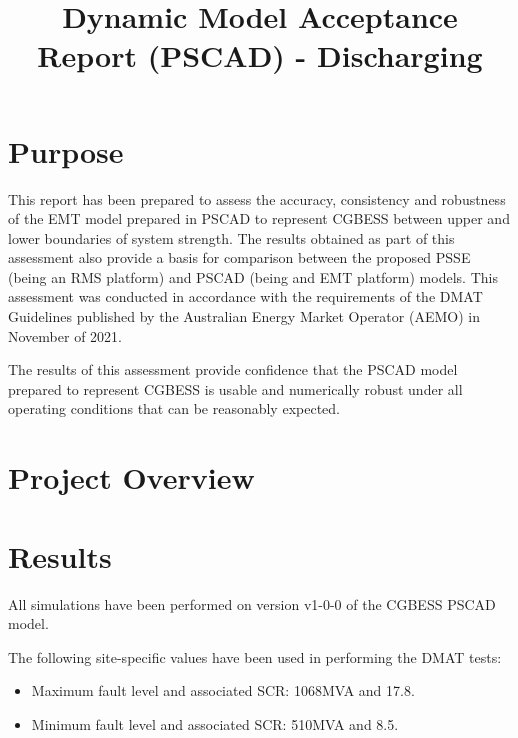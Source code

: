 \documentclass{../grid-link-report}
\title{Dynamic Model Acceptance Report (PSCAD) - Discharging}
\newcommand{\projectassetsdir}{../project-assets}
\begin{document}

	
	\frontmatter
	\maketitle
	
	\makedisclaimer
	\clearpage
	\tableofcontents
	\makerevisionhistorypage
	
	\mainmatter
	
	
	\chapter{Purpose}
	This report has been prepared to assess the accuracy, consistency and robustness of the \ac{EMT} model prepared in PSCAD to represent \ac{CGBESS} between upper and lower boundaries of system strength. The results obtained as part of this assessment also provide a basis for comparison between the proposed PSSE (being an \ac{RMS} platform) and PSCAD (being and \ac{EMT} platform) models. This assessment was conducted in accordance with the requirements of the \ac{DMAT} Guidelines published by the Australian Energy Market Operator (AEMO) in November of 2021\cite{dmat-nov-2021}.
	
	The results of this assessment provide confidence that the PSCAD model prepared to represent \ac{CGBESS} is usable and numerically robust under all operating conditions that can be reasonably expected.
	
	
	\chapter{Project Overview}
	
	
	\chapter{Results}
	
	All simulations have been performed on version v1-0-0 of the \ac{CGBESS} PSCAD model.
	
	The following site-specific values have been used in performing the \ac{DMAT} tests:
	
	\begin{itemize}
		\item Maximum fault level and associated \ac{SCR}: 1068MVA and 17.8\cite{connection-enquiry-response}.
		\item Minimum fault level and associated \ac{SCR}: 510MVA and 8.5\cite{connection-enquiry-response}.
	\end{itemize}
	
\end{document}

